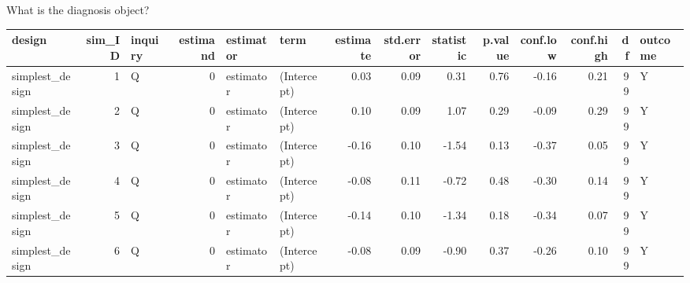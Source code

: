 \documentclass[
  11pt,
  ignorenonframetext,
]{beamer}
\newenvironment{Shaded}{\begin{snugshade}}{\end{snugshade}}
\newcommand{\AttributeTok}[1]{\textcolor[rgb]{0.40,0.45,0.13}{#1}}
\newcommand{\DecValTok}[1]{\textcolor[rgb]{0.68,0.00,0.00}{#1}}
\newcommand{\FunctionTok}[1]{\textcolor[rgb]{0.28,0.35,0.67}{#1}}
\newcommand{\NormalTok}[1]{\textcolor[rgb]{0.00,0.23,0.31}{#1}}
\newcommand{\SpecialCharTok}[1]{\textcolor[rgb]{0.37,0.37,0.37}{#1}}
\begin{document}
\begin{frame}[fragile]{What is the diagnosis object?}
\protect\hypertarget{what-is-the-diagnosis-object-1}{}
\begin{Shaded}
\end{Shaded}

\begin{tabular}{l|r|l|r|l|l|r|r|r|r|r|r|r|l}
\hline
design & sim\_ID & inquiry & estimand & estimator & term & estimate & std.error & statistic & p.value & conf.low & conf.high & df & outcome\\
\hline
simplest\_design & 1 & Q & 0 & estimator & (Intercept) & 0.03 & 0.09 & 0.31 & 0.76 & -0.16 & 0.21 & 99 & Y\\
\hline
simplest\_design & 2 & Q & 0 & estimator & (Intercept) & 0.10 & 0.09 & 1.07 & 0.29 & -0.09 & 0.29 & 99 & Y\\
\hline
simplest\_design & 3 & Q & 0 & estimator & (Intercept) & -0.16 & 0.10 & -1.54 & 0.13 & -0.37 & 0.05 & 99 & Y\\
\hline
simplest\_design & 4 & Q & 0 & estimator & (Intercept) & -0.08 & 0.11 & -0.72 & 0.48 & -0.30 & 0.14 & 99 & Y\\
\hline
simplest\_design & 5 & Q & 0 & estimator & (Intercept) & -0.14 & 0.10 & -1.34 & 0.18 & -0.34 & 0.07 & 99 & Y\\
\hline
simplest\_design & 6 & Q & 0 & estimator & (Intercept) & -0.08 & 0.09 & -0.90 & 0.37 & -0.26 & 0.10 & 99 & Y\\
\hline
\end{tabular}
\end{frame}
\end{document}
